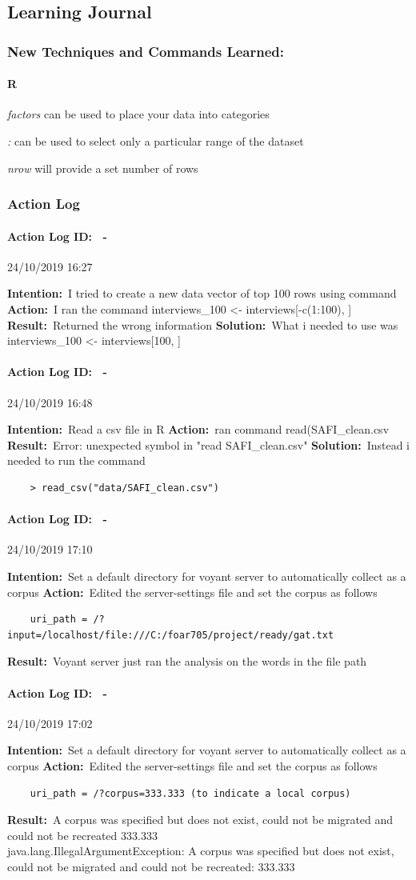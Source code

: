 \documentclass[12pt]{article}
\newcounter{problem} \setcounter{problem}{1}
\newcommand{\actionlog}[1]{\paragraph{Action Log ID: \theproblem\ -}{#1} ~\\ \addtocounter{problem}{1}}
\newcommand{\intention}[1]{\textbf{Intention:}{\textnormal\ #1} \newline}
\newcommand{\action}[1]{\textbf{Action:}{\textnormal\ #1} \newline}
\newcommand{\result}[1]{\textbf{Result:}{\textnormal\ #1} \newline}
\newcommand{\solution}[1]{\textbf{Solution:}{\textnormal\ #1} \newline}
\newcommand{\learning}[2]{\item \textit{#1} \textnormal{#2}}
\begin{document}
\subsection{Learning Journal}

\subsubsection{New Techniques and Commands Learned:}

\paragraph{R}

\learning{factors}{can be used to place your data into categories}
\learning{:}{can be used to select only a particular range of the dataset}
\learning{nrow}{will provide a set number of rows}

\subsubsection{Action Log}

\actionlog{24/10/2019 16:27}
\intention{I tried to create a new data vector of top 100 rows using command}
\action{I ran the command interviews\_100 <- interviews[-c(1:100), ]}
\result{Returned the wrong information}
\solution{What i needed to use was interviews\_100 <- interviews[100, ]}

\actionlog{24/10/2019 16:48}
\intention{Read a csv file in R}
\action{ran command read(SAFI_clean.csv}
\result{Error: unexpected symbol in "read SAFI_clean.csv"}
\solution{Instead i needed to run the command}
\begin{verbatim}
    > read_csv("data/SAFI_clean.csv")
\end{verbatim}


\actionlog{24/10/2019 17:10}
\intention{Set a default directory for voyant server to automatically collect as a corpus}
\action{Edited the server-settings file and set the corpus as follows}
\begin{verbatim}
    uri_path = /?input=/localhost/file:///C:/foar705/project/ready/gat.txt
\end{verbatim}
\result{Voyant server just ran the analysis on the words in the file path}

\actionlog{24/10/2019 17:02}
\intention{Set a default directory for voyant server to automatically collect as a corpus}
\action{Edited the server-settings file and set the corpus as follows}
\begin{verbatim}
    uri_path = /?corpus=333.333 (to indicate a local corpus)
\end{verbatim}
\result{A corpus was specified but does not exist, could not be migrated and could not be recreated 333.333\\
java.lang.IllegalArgumentException: A corpus was specified but does not exist, could not be migrated and could not be recreated: 333.333}
\end{document}
